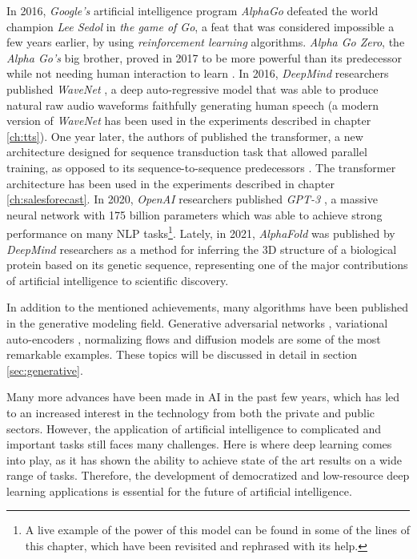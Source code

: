 In 2016, \textit{Google's} artificial intelligence program \textit{AlphaGo} \autocite{silver2016} defeated the world champion \textit{Lee Sedol} in \textit{the game of Go}, a feat that was considered impossible a few years earlier, by using \textit{reinforcement learning} algorithms. \textit{Alpha Go Zero}, the \textit{Alpha Go's} big brother, proved in 2017 to be more powerful than its predecessor while not needing human interaction to learn \autocite{Silver2017a, Silver2017b}. In 2016, \textit{DeepMind} researchers published \textit{WaveNet} \autocite{vanderoord2016}, a deep auto-regressive model that was able to produce natural raw audio waveforms faithfully generating human speech (a modern version of \textit{WaveNet} has been used in the experiments described in chapter \ref{ch:tts}). One year later, the authors of \autocite{vaswani2017} published the transformer, a new architecture designed for sequence transduction task that allowed parallel training, as opposed to its sequence-to-sequence predecessors \autocite{sutskever2014}. The transformer architecture has been used in the experiments described in chapter \ref{ch:salesforecast}. In 2020, \textit{OpenAI} researchers published \textit{GPT-3} \autocite{brown2020}, a massive neural network with 175 billion parameters which was able to achieve strong performance on many NLP tasks\footnote{A live example of the power of this model can be found in some of the lines of this chapter, which have been revisited and rephrased with its help.}. Lately, in 2021, \textit{AlphaFold} was published by \textit{DeepMind} researchers \autocite{Jumper2021} as a method for inferring the 3D structure of a biological protein based on its genetic sequence, representing one of the major contributions of artificial intelligence to scientific discovery. 

In addition to the mentioned achievements, many algorithms have been published in the generative modeling field. Generative adversarial networks \autocite{Goodfellow2014}, variational auto-encoders \autocite{kingma2019}, normalizing flows \autocite{kingma2016, kobyzev} and diffusion models \autocite{Prafulla2021} are some of the most remarkable examples. These topics will be discussed in detail in section \ref{sec:generative}.

Many more advances have been made in AI in the past few years, which has led to an increased interest in the technology from both the private and public sectors. However, the application of artificial intelligence to complicated and important tasks still faces many challenges. Here is where deep learning comes into play, as it has shown the ability to achieve state of the art results on a wide range of tasks. Therefore, the development of democratized and low-resource deep learning applications is essential for the future of artificial intelligence. 

